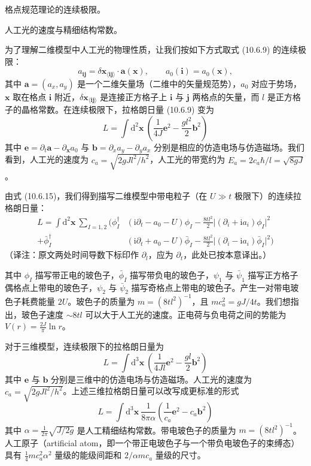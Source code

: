 \begin{keypoints}
\item 格点规范理论的连续极限。
\item 人工光的速度与精细结构常数。
\end{keypoints}

为了理解二维模型中人工光的物理性质，让我们按如下方式取式 (10.6.9) 的连续极限：
\begin{equation*}
a_{\pmb i\pmb j}=\delta\pmb x_{\langle\pmb i\pmb j\rangle}\cdot\pmb a(\pmb x),\qquad a_0(\pmb i)=a_0(\pmb x),
\end{equation*}
其中 $\pmb a=(a_x,a_y)$ 是一个二维矢量场（二维中的矢量规范势），$a_0$ 对应于势场，$\pmb x$ 取在格点 $\pmb i$ 附近，$\delta\pmb x_{\langle\pmb i\pmb j\rangle}$ 是连接正方格子上 $\pmb i$ 与 $\pmb j$ 两格点的矢量，而 $l$ 是正方格子的晶格常数。在连续极限下，拉格朗日量 (10.6.9) 变为
\begin{equation*}
L=\int\mathrm{d}^{2}\pmb x\ \left(\frac{1}{4J}\pmb e^{2}-\frac{gl^{2}}{2}\pmb b^{2}\right)\tag{10.6.16}
\end{equation*}
其中 $\pmb e=\partial_t\pmb a-\partial_{\pmb x}a_0$ 与 $\pmb b=\partial_x a_y-\partial_y a_x$ 分别是相应的仿造电场与仿造磁场。我们看到，人工光的速度为 $c_a=\sqrt{2gJl^{2}/h^{2}}$，人工光的带宽约为 $E_a=2c_a\hbar/l=\sqrt{8gJ}$。

由式 (10.6.15)，我们得到描写二维模型中带电粒子（在 $U\gg t$ 极限下）的连续拉格朗日量：
\begin{align*}
L=\int\mathrm{d}^{2}\pmb x\ \sum_{I=1,2}\Big(\phi^{\dagger}_{I}&(\mathrm{i}\partial_t-a_0-U)\phi_I-\frac{8tl^{2}}{2}\big|(\partial_{i}+\mathrm{i}a_{i})\phi_I\big|^{2}\\
+\bar{\phi}^{\dagger}_{I}&(\mathrm{i}\partial_t+a_0-U)\bar{\phi}_I-\frac{8tl^{2}}{2}\big|(\partial_{i}-\mathrm{i}a_{i})\bar{\phi}_I\big|^{2}\Big)
\end{align*}
（译注：原文两处时间导数下标印作 $\partial_l$，应为 $\partial_t$，此处已按本意译出。）

其中 $\phi_I$ 描写带正电的玻色子，$\bar{\phi}_I$ 描写带负电的玻色子，$\psi_1$ 与 $\bar{\psi}_1$ 描写正方格子偶格点上带电的玻色子，$\psi_2$ 与 $\bar{\psi}_2$ 描写奇格点上带电的玻色子。产生一对带电玻色子耗费能量 $2U$。玻色子的质量为 $m=(8tl^{2})^{-1}$，且 $mc_a^{2}=gJ/4t$。我们想指出，玻色子速度 $\sim 8tl$ 可以大于人工光的速度。正电荷与负电荷之间的势能为 $V(r)=\frac{2J}{\pi}\ln r$。

对于三维模型，连续极限下的拉格朗日量为
\begin{equation*}
L=\int\mathrm{d}^{3}\pmb x\ \left(\frac{1}{4Jl}\pmb e^{2}-\frac{gl}{2}\pmb b^{2}\right)\tag{10.6.17}
\end{equation*}
其中 $\pmb e$ 与 $\pmb b$ 分别是三维中的仿造电场与仿造磁场。人工光的速度为 $c_a=\sqrt{2gJl^{2}/h^{2}}$。上述三维拉格朗日量可以改写成更标准的形式
\begin{equation*}
L=\int\mathrm{d}^{3}\pmb x\ \frac{1}{8\pi\alpha}\left(\frac{1}{c_a}\pmb e^{2}-c_a\pmb b^{2}\right)\tag{10.6.18}
\end{equation*}
其中 $\alpha=\frac{1}{2\pi}\sqrt{J/2g}$ 是人工精细结构常数。带电玻色子的质量为 $m=(8tl^{2})^{-1}$。人工原子（artificial atom，即一个带正电玻色子与一个带负电玻色子的束缚态）具有 $\frac{1}{4}mc_a^{2}\alpha^{2}$ 量级的能级间距和 $2/\alpha mc_a$ 量级的尺寸。

